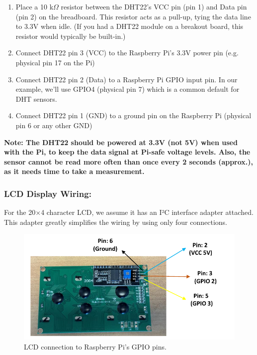 \documentclass[a4paper,11pt]{article}
\begin{document}
\begin{enumerate}
  \item Place a 10 k$\Omega$  resistor between the DHT22's VCC pin (pin 1) and Data pin (pin 2) on the breadboard.
This resistor acts as a pull-up, tying the data line to 3.3V when idle.
(If you had a DHT22 module on a breakout board, this resistor would typically be built-in.)
\item Connect DHT22 pin 3 (VCC) to the Raspberry Pi's 3.3V power pin (e.g. physical pin 17 on the Pi)
\item Connect DHT22 pin 2 (Data) to a Raspberry Pi GPIO input pin. In our example, we'll use GPIO4 (physical pin 7) which is a common default for DHT sensors.
\item Connect DHT22 pin 1 (GND) to a ground pin on the Raspberry Pi (physical pin 6 or any other GND)

\end{enumerate}

\noindent \textbf{Note: The DHT22 should be powered at 3.3V (not 5V) when used with the Pi, to keep the data signal at Pi-safe voltage levels. Also, the sensor cannot be read more often than once every 2 seconds (approx.), as it needs time to take a measurement.}


\subsubsection*{LCD Display Wiring:}
For the 20×4 character LCD, we assume it has an I²C interface adapter attached. 
This adapter greatly simplifies the wiring by using only four connections.

\begin{figure}[h] %
    \centering
    \includegraphics[width=.85\textwidth]{fig3.pdf} %
    \caption{LCD connection to Raspberry Pi's GPIO pins.}
    \label{fig:LCD}
\end{figure}
\end{document}

